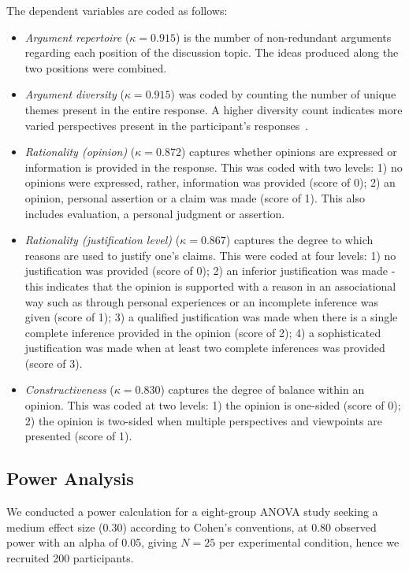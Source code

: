 The dependent variables are coded as follows:
\begin{itemize}
    \item \textit{Argument repertoire} ($\kappa = 0.915$) is the number of non-redundant arguments regarding each position of the discussion topic. The ideas produced along the two positions were combined.
    \item \textit{Argument diversity} ($\kappa = 0.915$) was coded by counting the number of unique themes present in the entire response. A higher diversity count indicates more varied perspectives present in the participant's responses~\cite{anderson2016all, gao2023coaicoder}.   
    \item \textit{Rationality (opinion)} ($\kappa = 0.872$) captures whether opinions are expressed or information is provided in the response. This was coded with two levels: 1) no opinions were expressed, rather, information was provided (score of 0); 2) an opinion, personal assertion or a claim was made (score of 1). This also includes evaluation, a personal judgment or assertion. 
    \item \textit{Rationality (justification level)} ($\kappa = 0.867$) captures the degree to which reasons are used to justify one's claims. This were coded at four levels: 1) no justification was provided (score of 0); 2) an inferior justification was made - this indicates that the opinion is supported with a reason in an associational way such as through personal experiences or an incomplete inference was given (score of 1); 3) a qualified justification was made when there is a single complete inference provided in the opinion (score of 2); 4) a sophisticated justification was made when at least two complete inferences was provided (score of 3).  
    \item \textit{Constructiveness} ($\kappa = 0.830$) captures the degree of balance within an opinion. This was coded at two levels: 1) the opinion is one-sided (score of 0); 2) the opinion is two-sided when multiple perspectives and viewpoints are presented (score of 1). 
\end{itemize}

\subsection{Power Analysis}
We conducted a power calculation for a eight-group ANOVA study seeking a medium effect size (0.30) according to Cohen’s conventions, at 0.80 observed power with an alpha of 0.05, giving $N=25$ per experimental condition, hence we recruited 200 participants. 

